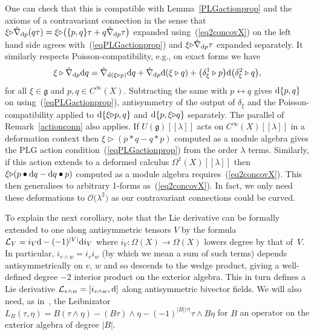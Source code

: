 \documentclass[pdftex]{sigma}
\numberwithin{equation}{section}
\newcommand{\<}{{\langle}}
\renewcommand{\>}{{\rangle}}
\newcommand{\CL}{{\mathcal{L}}}
\newcommand{\extd}{{\rm d}}
\newcommand{\la}{{\triangleright}}
\newcommand{\cg}{{\mathfrak{g}}}
\begin{document}
\begin{Remark}\label{remomegaXcov} One can check that this is compatible with Lemma~\ref{PLGactionprop} and the axioms of a contravariant connection in the sense that $\xi\la\hat\nabla_{\extd p}(q\tau)=\xi\la\big(\{p,q\}\tau+q\hat\nabla_{\extd p}\tau\big)$ expanded using~(\ref{eq2concovX}) on the left hand side agrees with~(\ref{eqPLGactionprop}) and $\xi\la\hat\nabla_{\extd p}\tau$ expanded separately. It similarly respects Poisson-compatibility, e.g., on exact forms we have
\begin{equation*}%
\xi\triangleright\hat{\nabla}_{\extd p}\extd q=\hat{\nabla}_{\extd(\xi\triangleright p)} \extd q+\hat{\nabla}_{\extd p}\extd(\xi\triangleright q)+\big(\delta_\xi^1\triangleright p\big)\extd\big(\delta_\xi^2\triangleright q\big), \end{equation*}
for all $\xi\in\cg$ and $p,q\in C^\infty(X)$. Subtracting the same with $p\leftrightarrow q$ gives $\extd\{p,q\}$ on using~(\ref{eqPLGactionprop}), antisymmetry of the output of $\delta_\xi$ and the Poisson-compatibility applied to $\extd\{\xi\la p,q\}$ and $\extd\{p,\xi\la q\}$ separately. The parallel of Remark~\ref{actionconn} also applies. If $U(\cg)[[\lambda]]$ acts on $C^\infty(X)[[\lambda]]$ in a deformation context then $\xi\la(p * q-q*p)$ computed as a module algebra gives the PLG action condition~(\ref{eqPLGactionprop}) from the order $\lambda$ terms. Similarly, if this action extends to a deformed calculus $\Omega^1(X)[[\lambda]]$ then $\xi\la(p\bullet\extd q-\extd q\bullet p)$ computed as a module algebra requires~(\ref{eq2concovX}). This then generalises to arbitrary 1-forms as~(\ref{eq2concovX}). In fact, we only need these deformations to $\mathcal{O}\big(\lambda^2\big)$ as our contravariant connections could be curved.
\end{Remark}


To explain the next corollary, note that the Lie derivative can be formally extended to one along antisymmetric tensors $V$ by the formula $\CL_V=i_V\extd -(-1)^{|V|} \extd i_V$ where $i_V\colon \Omega(X)\to \Omega(X)$ lowers degree by that of~$V$. In particular, $i_{v\wedge w}=i_v i_w$ (by which we mean a sum of such terms) depends antisymmetrically on $v$, $w$ and so descends to the wedge product, giving a well-defined degree $-2$ interior product on the exterior algebra. This in turn defines a Lie derivative $\CL_{v\wedge w}=[i_{v\wedge w},\extd]$ along antisymmetric bivector fields. We will also need, as in~\cite{Ma:rec}, the Leibnizator $L_B(\tau,\eta)=B(\tau\wedge\eta)-(B\tau)\wedge\eta-(-1)^{|B||\tau|}\tau\wedge B\eta$ for $B$ an operator on the exterior algebra of degree $|B|$.
\end{document}
